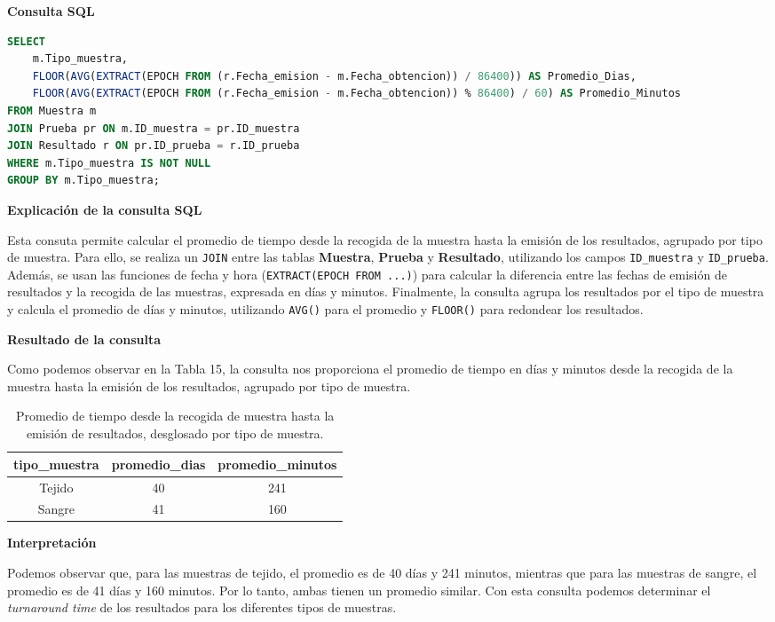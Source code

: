 \documentclass[spanish]{article}
\begin{document}
\textbf{Consulta SQL}

\begin{lstlisting}[language=SQL]
SELECT 
    m.Tipo_muestra, 
    FLOOR(AVG(EXTRACT(EPOCH FROM (r.Fecha_emision - m.Fecha_obtencion)) / 86400)) AS Promedio_Dias,
    FLOOR(AVG(EXTRACT(EPOCH FROM (r.Fecha_emision - m.Fecha_obtencion)) % 86400) / 60) AS Promedio_Minutos
FROM Muestra m
JOIN Prueba pr ON m.ID_muestra = pr.ID_muestra
JOIN Resultado r ON pr.ID_prueba = r.ID_prueba
WHERE m.Tipo_muestra IS NOT NULL
GROUP BY m.Tipo_muestra;
\end{lstlisting}

\textbf{Explicación de la consulta SQL}

Esta consuta permite calcular el promedio de tiempo desde la recogida de la muestra hasta la emisión de los resultados, agrupado por tipo de muestra. Para ello, se realiza un \texttt{JOIN} entre las tablas \textbf{Muestra}, \textbf{Prueba} y \textbf{Resultado}, utilizando los campos \texttt{ID\_muestra} y \texttt{ID\_prueba}. Además, se usan las funciones de fecha y hora (\texttt{EXTRACT(EPOCH FROM ...)}) para calcular la diferencia entre las fechas de emisión de resultados y la recogida de las muestras, expresada en días y minutos. Finalmente, la consulta agrupa los resultados por el tipo de muestra y calcula el promedio de días y minutos, utilizando \texttt{AVG()} para el promedio y \texttt{FLOOR()} para redondear los resultados.

\textbf{Resultado de la consulta}

Como podemos observar en la Tabla 15, la consulta nos proporciona el promedio de tiempo en días y minutos desde la recogida de la muestra hasta la emisión de los resultados, agrupado por tipo de muestra.

\begin{table}[h!]
\centering
\begin{tabular}{|c|c|c|}
\hline
\textbf{tipo\_muestra} & \textbf{promedio\_dias} & \textbf{promedio\_minutos} \\
\hline
Tejido & 40 & 241 \\ \hline
Sangre & 41 & 160 \\ \hline
\end{tabular}
\caption{Promedio de tiempo desde la recogida de muestra hasta la emisión de resultados, desglosado por tipo de muestra.}
\label{tab:historial_prueba}
\end{table}

\newpage
\textbf{Interpretación}

Podemos observar que, para las muestras de tejido, el promedio es de 40 días y 241 minutos, mientras que para las muestras de sangre, el promedio es de 41 días y 160 minutos. Por lo tanto, ambas tienen un promedio similar. Con esta consulta podemos determinar el \textit{turnaround time} de los resultados para los diferentes tipos de muestras.
\end{document}
